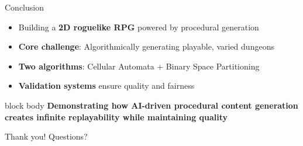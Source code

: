 \documentclass{beamer}
\begin{document}
\begin{frame}{Conclusion}
    \begin{itemize}
        \item Building a \textbf{2D roguelike RPG} powered by procedural generation
        \item \textbf{Core challenge}: Algorithmically generating playable, varied dungeons
        \item \textbf{Two algorithms}: Cellular Automata + Binary Space Partitioning
        \item \textbf{Validation systems} ensure quality and fairness
    \end{itemize}

    \vspace{0.3cm}

    \begin{beamercolorbox}[rounded=true,shadow=true,wd=\textwidth,center]{block body}
        \textbf{Demonstrating how AI-driven procedural content generation\\
        creates infinite replayability while maintaining quality}
    \end{beamercolorbox}

    \vspace{0.4cm}
    \centering
    \Large{Thank you! Questions?}
\end{frame}
\end{document}
